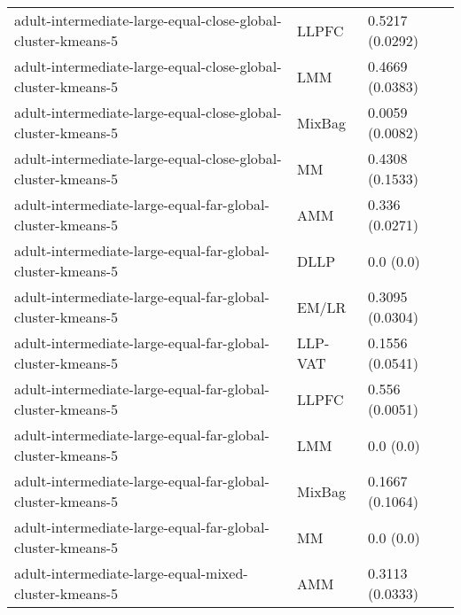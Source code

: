 \begin{longtable}{lll}
                                                 adult-intermediate-large-equal-close-global-cluster-kmeans-5 &     LLPFC &                       0.5217 (0.0292) \\
                                                 adult-intermediate-large-equal-close-global-cluster-kmeans-5 &       LMM &                       0.4669 (0.0383) \\
                                                 adult-intermediate-large-equal-close-global-cluster-kmeans-5 &    MixBag &                       0.0059 (0.0082) \\
                                                 adult-intermediate-large-equal-close-global-cluster-kmeans-5 &        MM &                       0.4308 (0.1533) \\
                                                   adult-intermediate-large-equal-far-global-cluster-kmeans-5 &       AMM &                        0.336 (0.0271) \\
                                                   adult-intermediate-large-equal-far-global-cluster-kmeans-5 &      DLLP &                             0.0 (0.0) \\
                                                   adult-intermediate-large-equal-far-global-cluster-kmeans-5 &     EM/LR &                       0.3095 (0.0304) \\
                                                   adult-intermediate-large-equal-far-global-cluster-kmeans-5 &   LLP-VAT &                       0.1556 (0.0541) \\
                                                   adult-intermediate-large-equal-far-global-cluster-kmeans-5 &     LLPFC &                        0.556 (0.0051) \\
                                                   adult-intermediate-large-equal-far-global-cluster-kmeans-5 &       LMM &                             0.0 (0.0) \\
                                                   adult-intermediate-large-equal-far-global-cluster-kmeans-5 &    MixBag &                       0.1667 (0.1064) \\
                                                   adult-intermediate-large-equal-far-global-cluster-kmeans-5 &        MM &                             0.0 (0.0) \\
                                                        adult-intermediate-large-equal-mixed-cluster-kmeans-5 &       AMM &                       0.3113 (0.0333) \\

\end{longtable}

